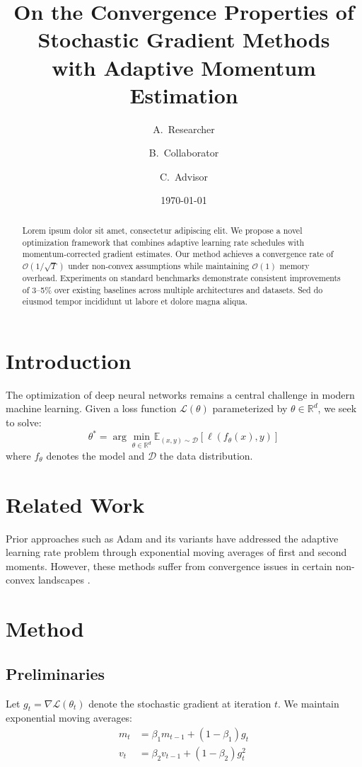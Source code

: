 \documentclass[11pt]{article}
\title{On the Convergence Properties of Stochastic Gradient Methods\\with Adaptive Momentum Estimation}
\author{A.\ Researcher \and B.\ Collaborator \and C.\ Advisor}
\date{\today}
\begin{document}
\maketitle

\begin{abstract}
Lorem ipsum dolor sit amet, consectetur adipiscing elit. We propose a novel optimization framework that combines adaptive learning rate schedules with momentum-corrected gradient estimates. Our method achieves a convergence rate of $\mathcal{O}(1/\sqrt{T})$ under non-convex assumptions while maintaining $\mathcal{O}(1)$ memory overhead. Experiments on standard benchmarks demonstrate consistent improvements of 3--5\% over existing baselines across multiple architectures and datasets. Sed do eiusmod tempor incididunt ut labore et dolore magna aliqua.
\end{abstract}

\section{Introduction}
\lipsum[1]

The optimization of deep neural networks remains a central challenge in modern machine learning. Given a loss function $\mathcal{L}(\theta)$ parameterized by $\theta \in \mathbb{R}^d$, we seek to solve:
\begin{equation}
    \theta^* = \arg\min_{\theta \in \mathbb{R}^d} \mathbb{E}_{(x,y) \sim \mathcal{D}} \left[ \ell(f_\theta(x), y) \right]
\end{equation}
where $f_\theta$ denotes the model and $\mathcal{D}$ the data distribution.

\lipsum[2]

\section{Related Work}
\lipsum[3-4]

Prior approaches such as Adam \cite{kingma2015adam} and its variants have addressed the adaptive learning rate problem through exponential moving averages of first and second moments. However, these methods suffer from convergence issues in certain non-convex landscapes \cite{reddi2018convergence}.

\section{Method}
\subsection{Preliminaries}
Let $g_t = \nabla \mathcal{L}(\theta_t)$ denote the stochastic gradient at iteration $t$. We maintain exponential moving averages:
\begin{align}
    m_t &= \beta_1 m_{t-1} + (1 - \beta_1) g_t \\
    v_t &= \beta_2 v_{t-1} + (1 - \beta_2) g_t^2
\end{align}
\end{document}
